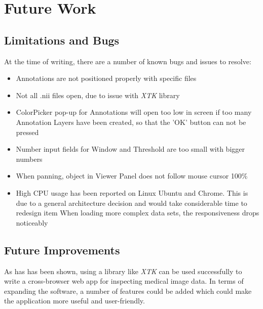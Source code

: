 \documentclass[a4paper,11pt,twoside]{article}
\begin{document}
\newpage
\section{Future Work}


\subsection{Limitations and Bugs}

At the time of writing, there are a number of known bugs and issues to resolve:

\begin{itemize}

\item Annotations are not positioned properly with specific files
\item Not all .nii files open, due to issue with \textit{XTK} library
\item ColorPicker pop-up for Annotations will open too low in screen if too many Annotation Layers have been created, so that the 'OK' button can not be pressed
\item Number input fields for Window and Threshold are too small with bigger numbers
\item When panning, object in Viewer Panel does not follow mouse cursor 100\%
\item High CPU usage has been reported on Linux Ubuntu and Chrome. This is due to a general architecture decision and would take considerable time to redesign
item When loading more complex data sets, the responsiveness drops noticeably

\end{itemize}


\subsection{Future Improvements}

As has has been shown, using a library like \textit{XTK} can be used successfully to write a cross-browser web app for inspecting medical image data. In terms of expanding the software, a number of features could be added which could make the application more useful and user-friendly.
\end{document}
